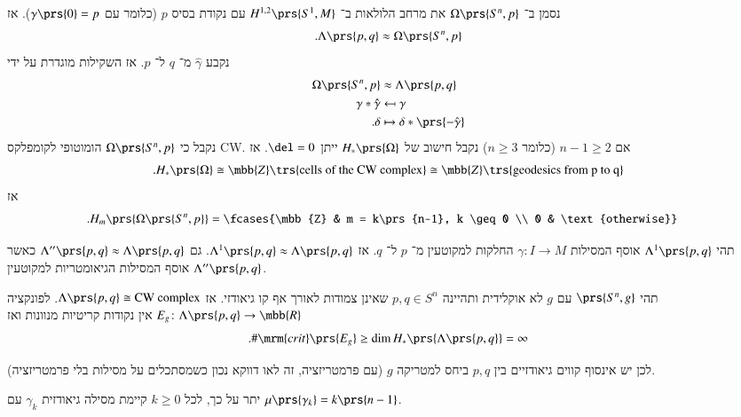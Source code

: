 \documentclass[a4paper,10pt,twoside,openany]{book}
\begin{document}
נסמן ב־%
$\Omega\prs{S^n, p}$
את מרחב הלולאות ב־%
$H^{1,2}\prs{S^1, M}$
עם נקודת בסיס
$p$
(כלומר עם
$\gamma\prs{0} = p$).
אז
\begin{align*}
\text{.} \Lambda\prs{p,q} \approx \Omega\prs{S^n, p}
\end{align*}
נקבע
$\hat{\gamma}$
מ־%
$q$
ל־%
$p$.
אז השקילות מוגדרת על ידי
\begin{align*}
\Omega\prs{S^n, p} &\approx \Lambda\prs{p,q} \\
\gamma* \hat{\gamma} &\mapsfrom \gamma \\
\text{.} \delta &\mapsto \delta * \prs{-\hat{\gamma}}
\end{align*}
נקבל כי
$\Omega\prs{S^n, p}$
הומוטופי לקומפלקס
\textenglish{CW}.
אם
$n - 1 \geq 2$
(כלומר $n \geq 3$)
נקבל חישוב של
$H_*\prs{\Omega}$
ייתן
$\del = 0$.
אז
\[\text{.} H_*\prs{\Omega} \cong \mbb{Z} \trs{\text{cells of the CW complex}} \cong \mbb{Z}\trs{\text{geodesics from p to q}}\]
אז
\begin{align*}
\text{.} H_m\prs{\Omega\prs{S^n, p}} &= \fcases{\mbb{Z} & m = k\prs{n-1}, k \geq 0 \\ 0 & \text{otherwise}}
\end{align*}

\begin{proposition}
תהי
$\Lambda^1\prs{p,q}$
אוסף המסילות
$\gamma \colon I \to M$
החלקות למקוטעין מ־%
$p$
ל־%
$q$.
אז
$\Lambda^1\prs{p,q} \approx \Lambda\prs{p,q}$.
גם
$\Lambda''\prs{p,q} \approx \Lambda\prs{p,q}$
כאשר
$\Lambda''\prs{p,q}$
אוסף המסילות הגיאומטריות למקוטעין.
\end{proposition}

\begin{corollary}
תהי
$\prs{S^n, g}$
עם
$g$
לא אוקלידית ותהיינה
$p,q \in S^n$
שאינן צמודות לאורך אף קו גיאודזי.
אז
$\Lambda\prs{p,q} \cong \text{CW complex}$.
לפונקציה
$E_g \colon \Lambda\prs{p,q} \to \mbb{R}$
אין נקודות קריטיות מנוונות ואז
\[\text{.} \# \mrm{crit}\prs{E_g} \geq \dim H_*\prs{\Lambda\prs{p,q}} = \infty\]

לכן יש אינסוף קווים גיאודזיים בין
$p,q$
ביחס למטריקה
$g$
(עם פרמטריזציה, זה לאו דווקא נכון כשמסתכלים על מסילות בלי פרמטריזציה).

יתר על כך, לכל
$k \geq 0$
קיימת מסילה גיאודזית
$\gamma_k$
עם
$\mu\prs{\gamma_k} = k \prs{n-1}$.
\end{corollary}



\backmatter
\end{document}
